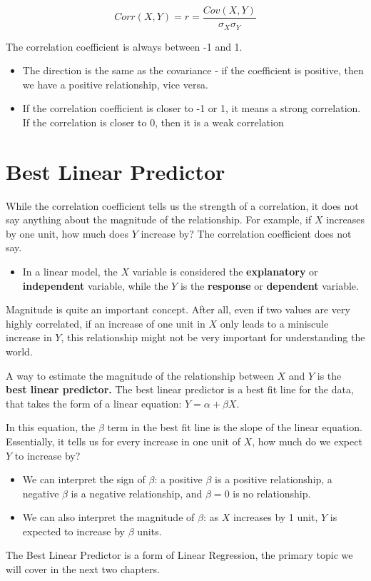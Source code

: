 \documentclass[
  a4paper,
]{report}
\providecommand{\tightlist}{%
  \setlength{\itemsep}{0pt}\setlength{\parskip}{0pt}}\usepackage{longtable,booktabs,array}
\begin{document}
\[
Corr(X,Y) = r = \frac{Cov(X,Y)}{\sigma_X \sigma_Y}
\]

The correlation coefficient is always between -1 and 1.

\begin{itemize}
\item
  The direction is the same as the covariance - if the coefficient is
  positive, then we have a positive relationship, vice versa.
\item
  If the correlation coefficient is closer to -1 or 1, it means a strong
  correlation. If the correlation is closer to 0, then it is a weak
  correlation
\end{itemize}

\section{Best Linear Predictor}\label{best-linear-predictor}

While the correlation coefficient tells us the strength of a
correlation, it does not say anything about the magnitude of the
relationship. For example, if \(X\) increases by one unit, how much does
\(Y\) increase by? The correlation coefficient does not say.

\begin{itemize}
\tightlist
\item
  In a linear model, the \(X\) variable is considered the
  \textbf{explanatory} or \textbf{independent} variable, while the \(Y\)
  is the \textbf{response} or \textbf{dependent} variable.
\end{itemize}

Magnitude is quite an important concept. After all, even if two values
are very highly correlated, if an increase of one unit in \(X\) only
leads to a miniscule increase in \(Y\), this relationship might not be
very important for understanding the world.

A way to estimate the magnitude of the relationship between \(X\) and
\(Y\) is the \textbf{best linear predictor.} The best linear predictor
is a best fit line for the data, that takes the form of a linear
equation: \(Y = \alpha + \beta X\).

In this equation, the \(\beta\) term in the best fit line is the slope
of the linear equation. Essentially, it tells us for every increase in
one unit of \(X\), how much do we expect \(Y\) to increase by?

\begin{itemize}
\tightlist
\item
  We can interpret the sign of \(\beta\): a positive \(\beta\) is a
  positive relationship, a negative \(\beta\) is a negative
  relationship, and \(\beta = 0\) is no relationship.
\item
  We can also interpret the magnitude of \(\beta\): as \(X\) increases
  by 1 unit, \(Y\) is expected to increase by \(\beta\) units.
\end{itemize}

The Best Linear Predictor is a form of Linear Regression, the primary
topic we will cover in the next two chapters.
\end{document}

